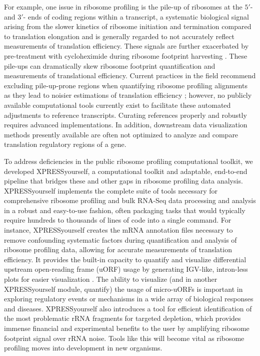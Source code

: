 \documentclass[10pt, oneside]{article}
\begin{document}
For example, one issue in ribosome profiling is the pile-up of ribosomes at the $5'$- and $3'$- ends of coding regions within a transcript, a systematic biological signal arising from the slower kinetics of ribosome initiation and termination compared to translation elongation and is generally regarded to not accurately reflect measurements of translation efficiency. These signals are further exacerbated by pre-treatment with cycloheximide during ribosome footprint harvesting \cite{gerashchenko_nar, artieri_gr, hussman_plosg}. These pile-ups can dramatically skew ribosome footprint quantification and measurements of translational efficiency. Current practices in the field recommend excluding pile-up-prone regions when quantifying ribosome profiling alignments as they lead to noisier estimations of translation efficiency \cite{ingolia_meth, weinberg_reports}; however, no publicly available computational tools currently exist to facilitate these automated adjustments to reference transcripts. Curating references properly and robustly requires advanced implementations. In addition, downstream data visualization methods presently available are often not optimized to analyze and compare translation regulatory regions of a gene.\par

To address deficiencies in the public ribosome profiling computational toolkit, we developed XPRESSyourself, a computational toolkit and adaptable, end-to-end pipeline that bridges these and other gaps in ribosome profiling data analysis. XPRESSyourself implements the complete suite of tools necessary for comprehensive ribosome profiling and bulk RNA-Seq data processing and analysis in a robust and easy-to-use fashion, often packaging tasks that would typically require hundreds to thousands of lines of code into a single command. For instance, XPRESSyourself creates the mRNA annotation files necessary to remove confounding systematic factors during quantification and analysis of ribosome profiling data, allowing for accurate measurements of translation efficiency. It provides the built-in capacity to quantify and visualize differential upstream open-reading frame (uORF) usage by generating IGV-like, intron-less plots for easier visualization \cite{igv}. The ability to visualize (and in another XPRESSyourself module, quantify) the usage of micro-uORFs is important in exploring regulatory events or mechanisms in a wide array of biological responses and diseases. XPRESSyourself also introduces a tool for efficient identification of the most problematic rRNA fragments for targeted depletion, which provides immense financial and experimental benefits to the user by amplifying ribosome footprint signal over rRNA noise. Tools like this will become vital as ribosome profiling moves into development in new organisms.\par
\end{document}
